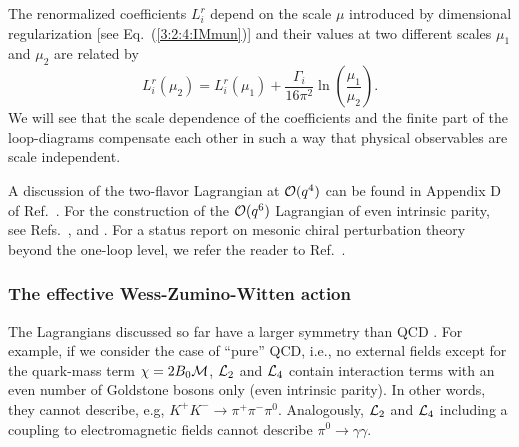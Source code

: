 \documentclass[twoside,12pt]{article}
\begin{document}
   The renormalized coefficients $L_i^r$ depend on the scale $\mu$
introduced by dimensional regularization [see Eq.\ (\ref{3:2:4:IMmun})] and
their values at two different scales $\mu_1$ and $\mu_2$
are related by
\begin{equation}
\label{3:3:1:limu1mu2}
L^r_i(\mu_2)=L^r_i(\mu_1)
+\frac{\Gamma_i}{16\pi^2}\ln\left(\frac{\mu_1}{\mu_2}\right).
\end{equation}
   We will see that the scale dependence of the coefficients and
the finite part of the loop-diagrams compensate each other in
such a way that physical observables are scale independent.

   A discussion of the two-flavor Lagrangian at ${\cal O}(q^4)$
\cite{Gasser:1983yg} can be found in Appendix D of Ref.\ \cite{Scherer:2002tk}.
   For the construction of the ${\cal O}(q^6)$ Lagrangian of even intrinsic
parity, see Refs.\ \cite{Scherer:1994wi}, \cite{Fearing:1994ga} and \cite{Bijnens:1999sh}.
   For a status report on mesonic chiral perturbation theory beyond the one-loop level, we
refer the reader to Ref.\ \cite{Bijnens:2006zp}.


\subsubsection{The effective Wess-Zumino-Witten action}
   The Lagrangians  discussed so far have a larger symmetry than QCD \cite{Witten:1983tw}.
   For example, if we consider the case of ``pure'' QCD, i.e., no external
fields except for the quark-mass term $\chi=2B_0 {\cal M}$, ${\cal L}_2$ and ${\cal L}_4$
contain interaction terms with an even number of Goldstone bosons
only (even intrinsic parity).
   In other words, they cannot describe, e.g, $K^+K^-\to\pi^+\pi^-\pi^0$.
   Analogously, ${\cal L}_2$ and ${\cal L}_4$ including a coupling to electromagnetic
fields cannot describe $\pi^0\to\gamma\gamma$.
\end{document}

